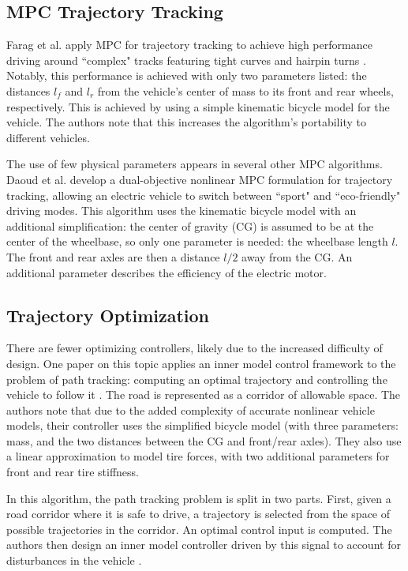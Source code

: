 \documentclass[conference]{IEEEtran}
\begin{document}
\subsection{MPC Trajectory Tracking}
Farag et al. apply MPC for trajectory tracking to achieve high performance driving around ``complex" tracks featuring tight curves and hairpin turns \cite{farag}. Notably,
this performance is achieved with only two parameters listed: the distances $l_f$ and $l_r$ from the vehicle's center of mass to its front and rear wheels, respectively. This is achieved by using a simple kinematic bicycle model for the vehicle. The authors note that this increases the algorithm's portability to different vehicles.

The use of few physical parameters appears in several other MPC algorithms. Daoud et al. develop  a dual-objective nonlinear MPC formulation for trajectory tracking, allowing an electric vehicle to switch between ``sport" and ``eco-friendly" driving modes. This algorithm uses the kinematic bicycle model with an additional simplification: the center of gravity (CG) is assumed to be at the center of the wheelbase, so only one parameter is needed: the wheelbase length $l$. The front and rear axles are then a distance $l/2$ away from the CG. An additional parameter describes the efficiency of the electric motor. 


\subsection{Trajectory Optimization}


There are fewer optimizing controllers, likely due to the increased difficulty of design. One paper on this topic applies an inner model control framework to the problem of path tracking: computing an optimal trajectory and controlling the vehicle to follow it \cite{pathtracking}. The road is represented as a corridor of allowable space. The authors note that due to the added complexity of accurate nonlinear vehicle models, their controller uses the simplified bicycle model (with three parameters: mass, and the two distances between the CG and front/rear axles). They also use a linear approximation to model tire forces, with two additional parameters for front and rear tire stiffness.

In this algorithm, the path tracking problem is split in two parts. First, given a road corridor where it is safe to drive, a trajectory is selected from the space of possible trajectories in the corridor. An optimal control input is computed. The authors then design an inner model controller driven by this signal to account for disturbances in the vehicle \cite{pathtracking}.
\end{document}
